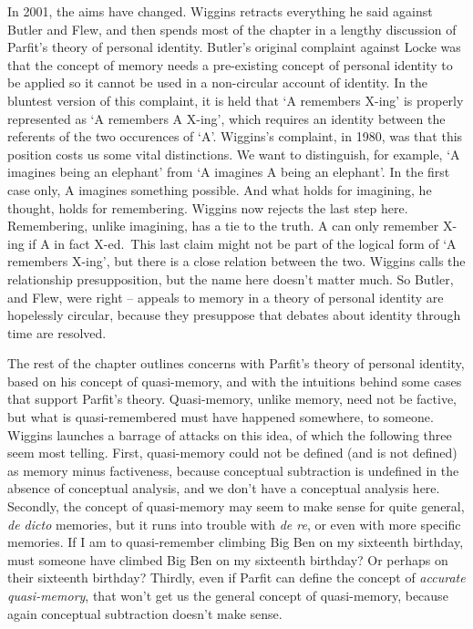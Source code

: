 \documentclass[
  10pt,
  letterpaper,
  DIV=11,
  numbers=noendperiod,
  twoside]{scrartcl}
\begin{document}
In 2001, the aims have changed. Wiggins retracts everything he said
against Butler and Flew, and then spends most of the chapter in a
lengthy discussion of Parfit's theory of personal identity. Butler's
original complaint against Locke was that the concept of memory needs a
pre-existing concept of personal identity to be applied so it cannot be
used in a non-circular account of identity. In the bluntest version of
this complaint, it is held that `A remembers X-ing' is properly
represented as `A remembers A X-ing', which requires an identity between
the referents of the two occurences of `A'. Wiggins's complaint, in
1980, was that this position costs us some vital distinctions. We want
to distinguish, for example, `A imagines being an elephant' from `A
imagines A being an elephant'. In the first case only, A imagines
something possible. And what holds for imagining, he thought, holds for
remembering. Wiggins now rejects the last step here. Remembering, unlike
imagining, has a tie to the truth. A can only remember X-ing if A in
fact X-ed.~This last claim might not be part of the logical form of `A
remembers X-ing', but there is a close relation between the two. Wiggins
calls the relationship presupposition, but the name here doesn't matter
much. So Butler, and Flew, were right -- appeals to memory in a theory
of personal identity are hopelessly circular, because they presuppose
that debates about identity through time are resolved.

The rest of the chapter outlines concerns with Parfit's theory of
personal identity, based on his concept of quasi-memory, and with the
intuitions behind some cases that support Parfit's theory. Quasi-memory,
unlike memory, need not be factive, but what is quasi-remembered must
have happened somewhere, to someone. Wiggins launches a barrage of
attacks on this idea, of which the following three seem most telling.
First, quasi-memory could not be defined (and is not defined) as memory
minus factiveness, because conceptual subtraction is undefined in the
absence of conceptual analysis, and we don't have a conceptual analysis
here. Secondly, the concept of quasi-memory may seem to make sense for
quite general, \emph{de dicto} memories, but it runs into trouble with
\emph{de re}, or even with more specific memories. If I am to
quasi-remember climbing Big Ben on my sixteenth birthday, must someone
have climbed Big Ben on my sixteenth birthday? Or perhaps on their
sixteenth birthday? Thirdly, even if Parfit can define the concept of
\emph{accurate quasi-memory}, that won't get us the general concept of
quasi-memory, because again conceptual subtraction doesn't make sense.
\end{document}
